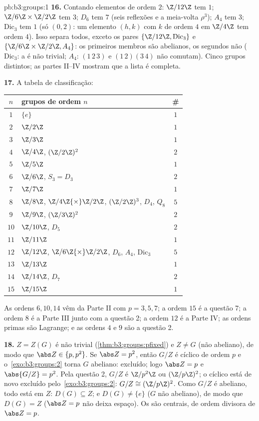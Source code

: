 \begin{solution}{pb:b3:groups:1}
\textbf{16.} Contando elementos de ordem $2$: $\Z/12\Z$ tem $1$;
$\Z/6\Z\times\Z/2\Z$ tem $3$; $D_6$ tem $7$ (seis reflexões e a meia-volta
$\rho^3$); $A_4$ tem $3$; $\mathrm{Dic}_3$ tem $1$ (só $(0, 2)$:
um elemento $(h, k)$ com $k$ de ordem $4$ em $\Z/4\Z$ tem
ordem $4$). Isso separa todos, exceto os pares $\{\Z/12\Z, \mathrm{Dic}_3\}$ e $\{\Z/6\Z\times\Z/2\Z, A_4\}$: os
primeiros membros são abelianos, os segundos não ($\mathrm{Dic}_3$: a  é não
trivial; $A_4$: $(1\,2\,3)$ e $(1\,2)(3\,4)$ não comutam). Cinco grupos distintos;
as partes II--IV mostram que a lista é completa.

\textbf{17.} A tabela de classificação:
\begin{center}
\begin{tabular}{c l c}
$n$ & grupos de ordem $n$ & \#\\
\hline
$1$ & $\{e\}$ & $1$\\
$2$ & $\Z/2\Z$ & $1$\\
$3$ & $\Z/3\Z$ & $1$\\
$4$ & $\Z/4\Z$, $(\Z/2\Z)^2$ & $2$\\
$5$ & $\Z/5\Z$ & $1$\\
$6$ & $\Z/6\Z$, $S_3 = D_3$ & $2$\\
$7$ & $\Z/7\Z$ & $1$\\
$8$ & $\Z/8\Z$, $\Z/4\Z{\times}\Z/2\Z$, $(\Z/2\Z)^3$, $D_4$,
      $Q_8$ & $5$\\
$9$ & $\Z/9\Z$, $(\Z/3\Z)^2$ & $2$\\
$10$ & $\Z/10\Z$, $D_5$ & $2$\\
$11$ & $\Z/11\Z$ & $1$\\
$12$ & $\Z/12\Z$, $\Z/6\Z{\times}\Z/2\Z$, $D_6$, $A_4$,
       $\mathrm{Dic}_3$ & $5$\\
$13$ & $\Z/13\Z$ & $1$\\
$14$ & $\Z/14\Z$, $D_7$ & $2$\\
$15$ & $\Z/15\Z$ & $1$\\
\end{tabular}
\end{center}
As ordens $6, 10, 14$ vêm da Parte II com $p = 3, 5, 7$; a ordem $15$ é a questão
7; a ordem $8$ é a Parte III junto com a questão 2; a ordem $12$
é a Parte IV; as ordens primas são Lagrange; e as ordens $4$ e
$9$ são a questão 2.

\textbf{18.} $Z = Z(G)$ é não trivial (\cref{thm:b3:groups:pfixed}) e $Z \neq G$ (não
abeliano), de modo que $\abs Z \in \{p, p^2\}$. Se $\abs Z = p^2$, então $G/Z$ é cíclico de
ordem $p$ e o~\cref{exo:b3:groups:2} torna $G$ abeliano: excluído; logo
$\abs Z = p$ e $\abs{G/Z} = p^2$. Pela questão 2, $G/Z$ é $\Z/p^2\Z$ ou $(\Z/p\Z)^2$; o cíclico está
de novo excluído pelo~\cref{exo:b3:groups:2}: $G/Z \cong (\Z/p\Z)^2$. Como $G/Z$ é abeliano,
todo  está em $Z$: $D(G) \subseteq Z$; e $D(G) \neq \{e\}$ ($G$ não abeliano), de
modo que $D(G) = Z$ ($\abs Z = p$ não deixa espaço). Os  são centrais, de
ordem divisora de $\abs Z = p$.


\end{solution}
